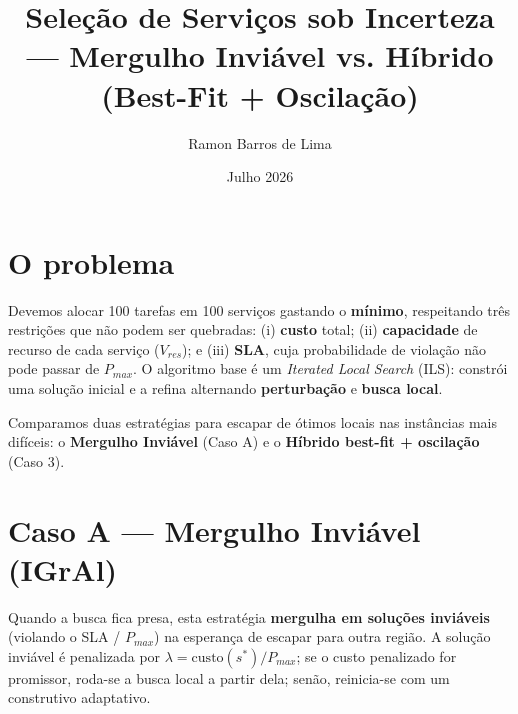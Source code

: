 \documentclass{article}
\title{Seleção de Serviços sob Incerteza --- Mergulho Inviável vs. Híbrido (Best-Fit + Oscilação)}
\author{Ramon Barros de Lima}
\date{Julho 2026}
\begin{document}
\maketitle

\section{O problema}

Devemos alocar 100 tarefas em 100 serviços gastando o \textbf{mínimo}, respeitando três
restrições que não podem ser quebradas: (i) \textbf{custo} total; (ii) \textbf{capacidade}
de recurso de cada serviço ($V_{res}$); e (iii) \textbf{SLA}, cuja probabilidade de violação
não pode passar de $P_{max}$. O algoritmo base é um \textit{Iterated Local Search} (ILS):
constrói uma solução inicial e a refina alternando \textbf{perturbação} e \textbf{busca local}.

Comparamos duas estratégias para escapar de ótimos locais nas instâncias mais difíceis:
o \textbf{Mergulho Inviável} (Caso A) e o \textbf{Híbrido best-fit + oscilação} (Caso 3).

\section{Caso A --- Mergulho Inviável (IGrAl)}

Quando a busca fica presa, esta estratégia \textbf{mergulha em soluções inviáveis} (violando o
SLA / $P_{max}$) na esperança de escapar para outra região. A solução inviável é penalizada
por $\lambda = \text{custo}(s^*)/P_{max}$; se o custo penalizado for promissor, roda-se a busca
local a partir dela; senão, reinicia-se com um construtivo adaptativo.
\end{document}
